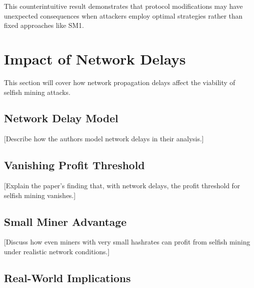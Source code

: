 \documentclass[conference]{IEEEtran}
\begin{document}
This counterintuitive result demonstrates that protocol modifications may have unexpected consequences when attackers employ optimal strategies rather than fixed approaches like SM1.



\section{Impact of Network Delays}

This section will cover how network propagation delays affect the viability of selfish mining attacks.

\subsection{Network Delay Model}

[Describe how the authors model network delays in their analysis.]

\subsection{Vanishing Profit Threshold}

[Explain the paper's finding that, with network delays, the profit threshold for selfish mining vanishes.]

\subsection{Small Miner Advantage}

[Discuss how even miners with very small hashrates can profit from selfish mining under realistic network conditions.]

\subsection{Real-World Implications}
\end{document}
